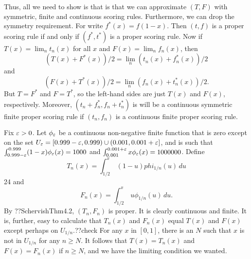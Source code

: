Thus, all we need to show is that is that we can approximate $(T,F)$ with symmetric, finite and continuous scoring rules.
Furthermore, we can drop the symmetry requirement. For write $f^*(x)=f(1-x)$. Then $(t,f)$ is a proper scoring rule if and
only if $(f^*,t^*)$ is a proper scoring rule. Now if $T(x)=\lim_n t_n(x)$ for all $x$ and $F(x)=\lim_n f_n(x)$, then
$$
    (T(x)+F^*(x))/2 = \lim_n (t_n(x)+f_n^*(x))/2
$$    
    and
$$    
    (F(x)+T^*(x))/2 = \lim_n (f_n(x)+t_n^*(x))/2. 
$$    
But $T=F^*$ and $F=T^*$, so the left-hand sides are just $T(x)$ and $F(x)$, respectively. Moreover, $(t_n+f_n^*,f_n+t_n^*)$ is 
will be a continuous symmetric finite proper scoring rule if $(t_n,f_n)$ is a continuous finite proper scoring rule.

Fix $\varepsilon>0$. Let $\phi_\varepsilon$ be a continuous non-negative finite function that is zero except on the set $U_\varepsilon=[0.999-\varepsilon,0.999)\cup (0.001,0.001+\varepsilon]$, 
and is such that $\int_{0.999-\varepsilon}^{0.999} (1-x) \phi_\varepsilon(x) = 1000$ and $\int_{0.001}^{0.001+\varepsilon} x \phi_\varepsilon(x) = 1000000$. 
Define 
$$
    T_n(x) = \int_{1/2}^x \, (1-u)phi_{1/n}(u) \, du
$$24
and 
$$
    F_n(x) = \int_{1/2}^x \, u \phi_{1/n}(u) \, du.
$$
By ??SchervishThm4.2, $(T_n,F_n)$ is proper. It is clearly continuous and finite. It is, further, easy to calculate that 
$T_n(x)$ and $F_n(x)$ equal $T(x)$ and $F(x)$ except perhaps on $U_{1/n}$.??check For any $x$ in $[0,1]$, there is an $N$
such that $x$ is not in $U_{1/n}$ for any $n\ge N$. It follows that $T(x)=T_n(x)$ and $F(x)=F_n(x)$ if $n\ge N$, and we have
the limiting condition we wanted.

\chaptertail 


